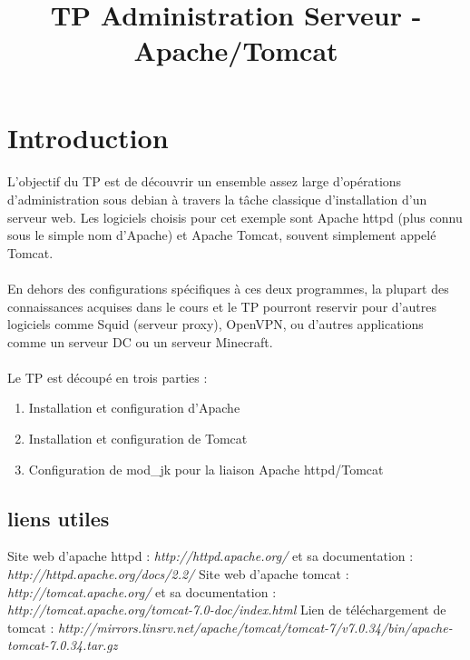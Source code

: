 \documentclass[12pt,a4paper]{article}
\title{TP Administration Serveur - Apache/Tomcat}
\begin{document}
\maketitle{}

\section{Introduction}
\paragraph{}
L'objectif du TP est de découvrir un ensemble assez large d'opérations d'administration sous debian à travers la tâche classique d'installation d'un serveur web. Les logiciels choisis pour cet exemple sont Apache httpd (plus connu sous le simple nom d'Apache) et Apache Tomcat, souvent simplement appelé Tomcat.

\paragraph{}
En dehors des configurations spécifiques à ces deux programmes, la plupart des connaissances acquises dans le cours et le TP pourront reservir pour d'autres logiciels comme Squid (serveur proxy), OpenVPN, ou d'autres applications comme un serveur DC ou un serveur Minecraft.

\paragraph{}
Le TP est découpé en trois parties : 
\begin{enumerate}
    \item Installation et configuration d'Apache
    \item Installation et configuration de Tomcat
    \item Configuration de mod\_jk pour la liaison Apache httpd/Tomcat
\end{enumerate}

\subsection{liens utiles}
    
Site web d'apache httpd : \textit{http://httpd.apache.org/} et sa documentation : \textit{http://httpd.apache.org/docs/2.2/}
Site web d'apache tomcat : \textit{http://tomcat.apache.org/} et sa documentation : \textit{http://tomcat.apache.org/tomcat-7.0-doc/index.html}
Lien de téléchargement de tomcat : \textit{http://mirrors.linsrv.net/apache/tomcat/tomcat-7/v7.0.34/bin/apache-tomcat-7.0.34.tar.gz}
\end{document}
